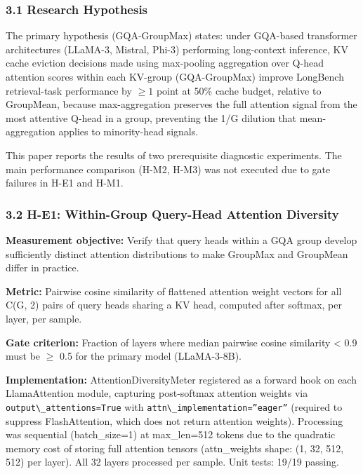 
\subsubsection{3.1 Research Hypothesis}

The primary hypothesis (GQA-GroupMax) states: under GQA-based transformer architectures (LLaMA-3, Mistral, Phi-3) performing long-context inference, KV cache eviction decisions made using max-pooling aggregation over Q-head attention scores within each KV-group (GQA-GroupMax) improve LongBench retrieval-task performance by $\geq 1$ point at 50\% cache budget, relative to GroupMean, because max-aggregation preserves the full attention signal from the most attentive Q-head in a group, preventing the 1/G dilution that mean-aggregation applies to minority-head signals.

This paper reports the results of two prerequisite diagnostic experiments. The main performance comparison (H-M2, H-M3) was not executed due to gate failures in H-E1 and H-M1.

\subsubsection{3.2 H-E1: Within-Group Query-Head Attention Diversity}

\textbf{Measurement objective:} Verify that query heads within a GQA group develop sufficiently distinct attention distributions to make GroupMax and GroupMean differ in practice.

\textbf{Metric:} Pairwise cosine similarity of flattened attention weight vectors for all C(G, 2) pairs of query heads sharing a KV head, computed after softmax, per layer, per sample.

\textbf{Gate criterion:} Fraction of layers where median pairwise cosine similarity < 0.9 must be $\geq$ 0.5 for the primary model (LLaMA-3-8B).

\textbf{Implementation:} AttentionDiversityMeter registered as a forward hook on each LlamaAttention module, capturing post-softmax attention weights via \texttt{output\textbackslash \_attentions=True} with \texttt{attn\textbackslash \_implementation=''eager''} (required to suppress FlashAttention, which does not return attention weights). Processing was sequential (batch\_size=1) at max\_len=512 tokens due to the quadratic memory cost of storing full attention tensors (attn\_weights shape: (1, 32, 512, 512) per layer). All 32 layers processed per sample. Unit tests: 19/19 passing.


